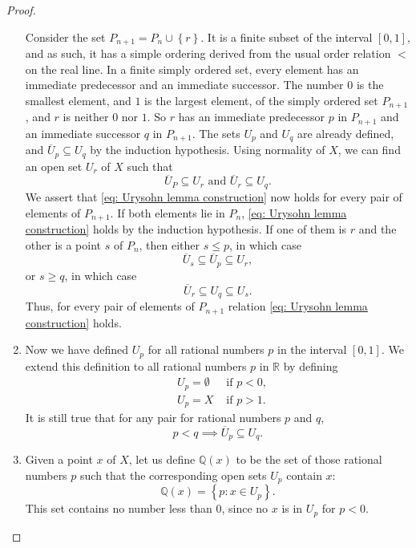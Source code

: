 \begin{proof}
\begin{enumerate}
      Consider the set \( P_{n+1} = P_n \cup \left\lbrace r \right\rbrace \).
      It is a finite subset of the interval \( [0, 1] \), and as such, it has a simple ordering derived from the usual order relation \( < \) on the real line.
      In a finite simply ordered set, every element has an immediate predecessor and an immediate successor.
      The number \( 0 \) is the smallest element, and \( 1 \) is the largest element, of the simply ordered set \( P_{n + 1} \), and \( r \) is neither \( 0 \) nor \( 1 \).
      So \( r \) has an immediate predecessor \( p \) in \( P_{n + 1} \) and an immediate successor \( q \) in \( P_{n + 1} \).
      The sets \( U_p \) and \( U_q \) are already defined, and \( \overline{U}_p \subseteq U_q \) by the induction hypothesis.
      Using normality of \( X \), we can find an open set \( U_r \) of \( X \) such that
      \[
        \overline{U}_P \subseteq U_r \text{ and } \overline{U}_r \subseteq U_q.
      \]
      We assert that \eqref{eq: Urysohn lemma construction} now holds for every pair of elements of \( P_{n + 1} \).
      If both elements lie in \( P_n \), \eqref{eq: Urysohn lemma construction} holds by the induction hypothesis.
      If one of them is \( r \) and the other is a point \( s \) of \( P_n \), then either \( s \leq p \), in which case
      \[
        \overline{U}_s \subseteq \overline{U}_p \subseteq U_r,
      \]
      or \( s \geq q \), in which case
      \[
        \overline{U}_r \subseteq U_q \subseteq U_s.
      \]
      Thus, for every pair of elements of \( P_{n + 1} \) relation \eqref{eq: Urysohn lemma construction} holds.
    \item Now we have defined \( U_p \) for all rational numbers \( p \) in the interval \( [0, 1] \).
      We extend this definition to all rational numbers \( p \) in \( \mathbb{R} \) by defining
      \begin{align*}
        &U_p = \emptyset & \text{ if } p < 0,\\
        &U_p = X & \text{ if } p > 1
      .\end{align*}
      It is still true that for any pair for rational numbers \( p \) and \( q \),
      \[
        p < q \implies \overline{U}_p \subseteq U_q.
      \]
    \item Given a point \( x \) of \( X \), let us define \( \mathbb{Q}(x) \) to be the set of those rational numbers \( p \) such that the corresponding open sets \( U_p \) contain \( x \):
      \[
        \mathbb{Q}(x) = \left\lbrace p: x \in U_p \right\rbrace.
      \]
      This set contains no number less than \( 0 \), since no \( x \) is in \( U_p \) for \( p < 0 \).

\end{enumerate}
\end{proof}
